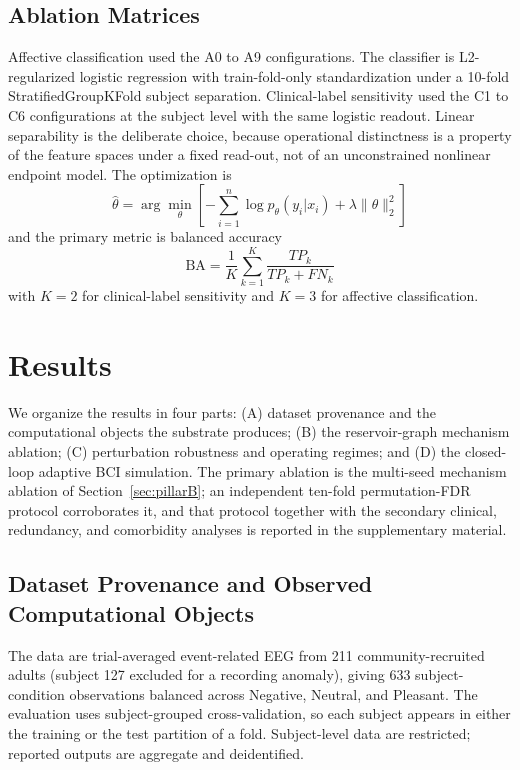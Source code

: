 \documentclass[journal]{IEEEtran}
\newcommand{\BA}{\mathrm{BA}}
\begin{document}


\subsection{Ablation Matrices}
Affective classification used the A0 to A9 configurations. The classifier is L2-regularized logistic regression with train-fold-only standardization under a 10-fold StratifiedGroupKFold subject separation. Clinical-label sensitivity used the C1 to C6 configurations at the subject level with the same logistic readout. Linear separability is the deliberate choice, because operational distinctness is a property of the feature spaces under a fixed read-out, not of an unconstrained nonlinear endpoint model. The optimization is
\begin{equation}
\hat{\theta}=\arg\min_{\theta}\left[-\sum_{i=1}^{n}\log p_{\theta}(y_i|x_i)+\lambda\|\theta\|_2^2\right]
\label{eq:logreg}
\end{equation}
and the primary metric is balanced accuracy
\begin{equation}
\BA=\frac{1}{K}\sum_{k=1}^{K}\frac{TP_k}{TP_k+FN_k}
\label{eq:ba}
\end{equation}
with $K=2$ for clinical-label sensitivity and $K=3$ for affective classification.

\section{Results}
We organize the results in four parts: (A) dataset provenance and the computational objects the substrate produces; (B) the reservoir-graph mechanism ablation; (C) perturbation robustness and operating regimes; and (D) the closed-loop adaptive BCI simulation. The primary ablation is the multi-seed mechanism ablation of Section~\ref{sec:pillarB}; an independent ten-fold permutation-FDR protocol corroborates it, and that protocol together with the secondary clinical, redundancy, and comorbidity analyses is reported in the supplementary material.

\subsection{Dataset Provenance and Observed Computational Objects}\label{sec:pillarA}
The data are trial-averaged event-related EEG from 211 community-recruited adults (subject 127 excluded for a recording anomaly), giving 633 subject-condition observations balanced across Negative, Neutral, and Pleasant. The evaluation uses subject-grouped cross-validation, so each subject appears in either the training or the test partition of a fold. Subject-level data are restricted; reported outputs are aggregate and deidentified.
\end{document}
